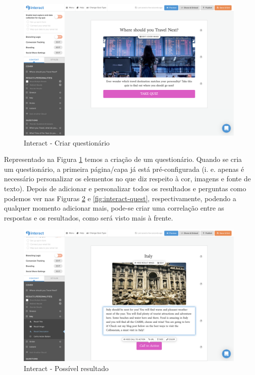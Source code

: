 \begin{figure}[ht!]
	\begin{center}
		\includegraphics[width=1\textwidth]{img/interact/create}
		\caption{Interact - Criar questionário}
		\label{fig:interact-create}
	\end{center}
\end{figure}

Representado na Figura \ref{fig:interact-create} temos a criação de um questionário. Quando se cria um questionário, a primeira página/capa já está pré-configurada (i. e. apenas é necessário personalizar os elementos no que diz respeito à cor, imagens e fonte de texto). Depois de adicionar e personalizar todos os resultados e perguntas como podemos ver nas Figuras \ref{fig:interact-result} e \ref{fig:interact-quest}, respectivamente, podendo a qualquer momento adicionar mais, pode-se criar uma correlação entre as respostas e os resultados, como será visto mais à frente.


\begin{figure}[ht!]
	\begin{center}
		\includegraphics[width=1\textwidth]{img/interact/result}
		\caption{Interact - Possível resultado}
		\label{fig:interact-result}
	\end{center}
\end{figure}


